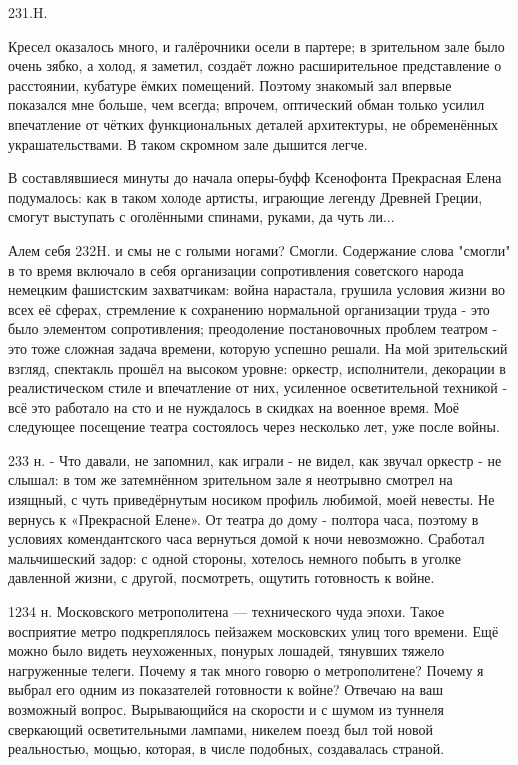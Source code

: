 231.H.

Кресел оказалось много, и галёрочники осели в партере; в зрительном зале было очень зябко, а холод, я заметил, создаёт ложно расширительное представление о расстоянии, кубатуре ёмких помещений. Поэтому знакомый зал впервые показался мне больше, чем всегда; впрочем, оптический обман только усилил впечатление от чётких функциональных деталей архитектуры, не обременённых украшательствами. В таком скромном зале дышится легче.

В составлявшиеся минуты до начала оперы-буфф Ксенофонта Прекрасная Елена подумалось: как в таком холоде артисты, играющие легенду Древней Греции, смогут выступать с оголёнными спинами, руками, да чуть ли...

Алем себя 232H. и смы не с голыми ногами? Смогли. Содержание слова "смогли" в то время включало в себя организации сопротивления советского народа немецким фашистским захватчикам: война нарастала, грушила условия жизни во всех её сферах, стремление к сохранению нормальной организации труда - это было элементом сопротивления; преодоление постановочных проблем театром - это тоже сложная задача времени, которую успешно решали. На мой зрительский взгляд, спектакль прошёл на высоком уровне: оркестр, исполнители, декорации в реалистическом стиле и впечатление от них, усиленное осветительной техникой - всё это работало на сто и не нуждалось в скидках на военное время. Моё следующее посещение театра состоялось через несколько лет, уже после войны.

233 н.
- Что давали, не запомнил, как играли - не видел, как звучал оркестр - не слышал: в том же затемнённом зрительном зале я неотрывно смотрел на изящный, с чуть приведёрнутым носиком профиль любимой, моей невесты. Не вернусь к «Прекрасной Елене».
От театра до дому - полтора часа, поэтому в условиях комендантского часа вернуться домой к ночи невозможно. Сработал мальчишеский задор: с одной стороны, хотелось немного побыть в уголке давленной жизни, с другой, посмотреть, ощутить готовность к войне.

1234 н.
Московского метрополитена — технического чуда эпохи. Такое восприятие метро подкреплялось пейзажем московских улиц того времени. Ещё можно было видеть неухоженных, понурых лошадей, тянувших тяжело нагруженные телеги.
Почему я так много говорю о метрополитене? Почему я выбрал его одним из показателей готовности к войне? Отвечаю на ваш возможный вопрос. Вырывающийся на скорости и с шумом из туннеля сверкающий осветительными лампами, никелем поезд был той новой реальностью, мощью, которая, в числе подобных, создавалась страной.

